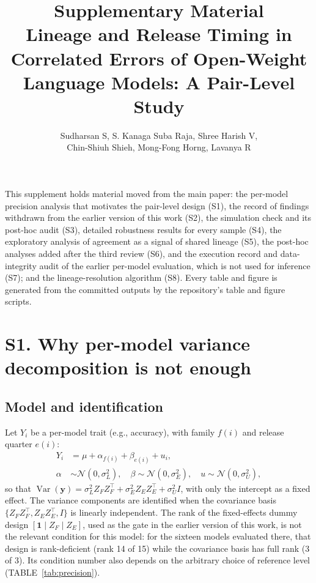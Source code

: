 \documentclass[10pt]{article}
\title{Supplementary Material\\[4pt]\large Lineage and Release Timing in Correlated Errors of Open-Weight Language Models: A Pair-Level Study}
\author{Sudharsan S, S. Kanaga Suba Raja, Shree Harish V,\\ Chin-Shiuh Shieh, Mong-Fong Horng, Lavanya R}
\date{}
\begin{document}
\sloppy
\maketitle
\noindent This supplement holds material moved from the main paper: the per-model precision analysis that motivates the pair-level design (S1), the record of findings withdrawn from the earlier version of this work (S2), the simulation check and its post-hoc audit (S3), detailed robustness results for every sample (S4), the exploratory analysis of agreement as a signal of shared lineage (S5), the post-hoc analyses added after the third review (S6), and the execution record and data-integrity audit of the earlier per-model evaluation, which is not used for inference (S7); and the lineage-resolution algorithm (S8). Every table and figure is generated from the committed outputs by the repository's table and figure scripts.

\section*{S1. Why per-model variance decomposition is not enough}\label{sec:precision}

\subsection*{Model and identification}
Let $Y_i$ be a per-model trait (e.g., accuracy), with family $f(i)$ and release quarter $e(i)$:
\begin{equation}
\begin{aligned}
Y_i &= \mu + \alpha_{f(i)} + \beta_{e(i)} + u_i,\\
\alpha &\sim \mathcal{N}(0,\sigma^2_L),\quad \beta \sim \mathcal{N}(0,\sigma^2_E),\quad u \sim \mathcal{N}(0,\sigma^2_U),
\end{aligned}
\label{eq:vc}
\end{equation}
so that $\operatorname{Var}(\mathbf{y}) = \sigma^2_L Z_F Z_F^\top + \sigma^2_E Z_E Z_E^\top + \sigma^2_U I$, with only the intercept as a fixed effect. The variance components are identified when the covariance basis $\{Z_F Z_F^\top, Z_E Z_E^\top, I\}$ is linearly independent. The rank of the fixed-effects dummy design $[\mathbf{1} \mid Z_F \mid Z_E]$, used as the gate in the earlier version of this work, is not the relevant condition for this model: for the sixteen models evaluated there, that design is rank-deficient (rank 14 of 15) while the covariance basis has full rank (3 of 3). Its condition number also depends on the arbitrary choice of reference level (TABLE~\ref{tab:precision}).
\end{document}

